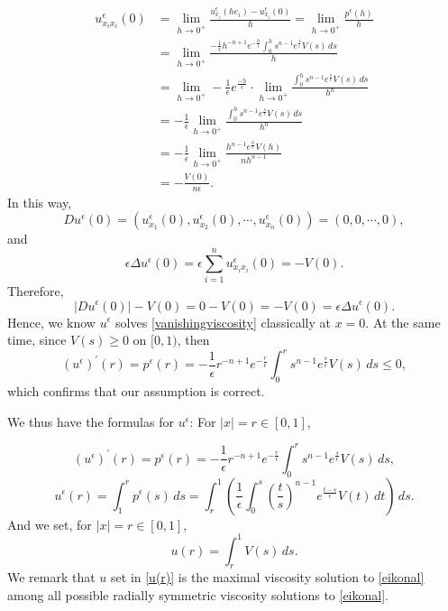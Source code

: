 \documentclass[12pt,reqno]{amsart}
\numberwithin{figure}{section}
\theoremstyle{plain}
\numberwithin{equation}{section}
\begin{document}
\begin{equation*}
\begin{aligned}
    u_{x_i x_i}^{\epsilon}(0) &= \lim_{h \rightarrow 0^+}\frac{u^{\epsilon}_{x_i}(he_i)-u^{\epsilon}_{x_i}(0)}{h} =  \lim_{h \rightarrow 0^+}\frac{p^{\epsilon}(h)}{h} \\
    &= \lim_{h \rightarrow 0^+}\frac{ -\frac{1}{\epsilon}h^{-n+1}e^{-\frac{h}{\epsilon}}  \int_{0}^{h} s^{n-1}e^{\frac{s}{\epsilon}}V(s)\,ds }{h}\\
    &= \lim_{h \rightarrow 0^+}-\frac{1}{\epsilon} e^{\frac{-h}{\epsilon}}\cdot \lim_{h \rightarrow 0^+}\frac{ \int_{0}^{h} s^{n-1}e^{\frac{s}{\epsilon}}V(s)\,ds}{h^n}\\
    &= -\frac{1}{\epsilon}\lim_{h \rightarrow 0^+}\frac{ \int_{0}^{h} s^{n-1}e^{\frac{s}{\epsilon}}V(s)\,ds}{h^n}\\
    &= -\frac{1}{\epsilon}\lim_{h \rightarrow 0^+}\frac{h^{n-1}e^{\frac{h}{\epsilon}} V(h)}{nh^{n-1}} \\
    &= -\frac{V(0)}{n\epsilon}. 
\end{aligned}
\end{equation*}
In this way,
\begin{equation*}
    Du^{\epsilon}(0) = (u^{\epsilon}_{x_1}(0),u^{\epsilon}_{x_2}(0),\cdots ,u^{\epsilon}_{x_n}(0))=(0,0,\cdots,0) ,
\end{equation*}
and
\begin{equation*}
     \epsilon\Delta u^{\epsilon}(0)= \epsilon \sum_{i=1}^n u^{\epsilon}_{x_i x_i}(0)= -V(0).
\end{equation*}
Therefore, 
\begin{equation*}
    |Du^{\epsilon}(0)|-V(0) =0-V(0)=-V(0)= \epsilon \Delta u^{\epsilon}(0).
\end{equation*}
Hence, we know $u^\epsilon$ solves \eqref{vanishingviscosity} classically at $x=0$. 
At the same time, since $V(s) \ge 0$ on $[0,1)$, then 
\begin{equation*}
    (u^{\epsilon})^{'}(r)= p^{\epsilon}(r)= -\frac{1}{\epsilon}r^{-n+1}e^{-\frac{r}{\epsilon}}  \int_{0}^{r} s^{n-1}e^{\frac{s}{\epsilon}}V(s)\,ds \le 0,
\end{equation*}
which confirms that our assumption is correct.

We thus have the formulas for $u^{\epsilon}$: For $|x|=r\in[0,1]$,

\[ 
     (u^{\epsilon})^{'}(r) = p^{\epsilon}(r)= -\frac{1}{\epsilon}r^{-n+1}e^{-\frac{r}{\epsilon}}  \int_{0}^{r} s^{n-1}e^{\frac{s}{\epsilon}}V(s)\,ds,
\]
\begin{equation}\label{solution_formula}
u^{\epsilon}(r) = \int_1^r p^{\epsilon}(s) \, ds = \int_r^1 \left(\frac{1}{\epsilon}\int_0^s \left(\frac{t}{s}\right)^{n-1} e^{\frac{t-s}{\epsilon}}V(t)\, dt\right)\, ds. 
\end{equation}
And we set, for $|x|=r\in[0,1]$,
\begin{equation}\label{u(r)}
     u(r) = \int_r^1 V(s)\, ds. 
\end{equation}
We remark that $u$ set in \eqref{u(r)} is the maximal viscosity solution to \eqref{eikonal} among all possible radially symmetric viscosity solutions to \eqref{eikonal}.
\end{document}
